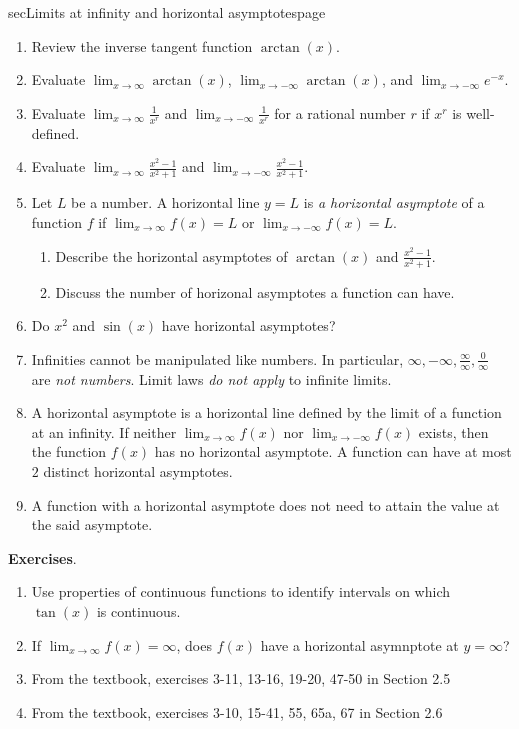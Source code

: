 \documentclass[../main]{subfiles}
\begin{document}
\begin{outline}{sec}{Limits at infinity and horizontal asymptotes}{page}
\begin{enumerate}
    \item Review the inverse tangent function \(\arctan(x)\).
    \item Evaluate \(\lim_{x \to \infty} \arctan(x)\), \(\lim_{x \to -\infty} \arctan(x)\), and \({\lim_{x \to -\infty}} e^{-x}\).
    \item Evaluate \({\lim_{x \to \infty}} \frac{1}{x^{r}}\) and \({\lim_{x \to -\infty}} \frac{1}{x^{r}}\) for a rational number \(r\) if \(x^{r}\) is well-defined.
    \item Evaluate \(\lim_{x \to \infty} \frac{x^{2} - 1}{x^{2} + 1}\) and \(\lim_{x \to -\infty} \frac{x^{2} - 1}{x^{2} + 1}\).
    \item {Let \(L\) be a number. A horizontal line \(y = L\) is \emph{a horizontal asymptote} of a function \(f\) if \(\lim_{x \to \infty} f(x) = L\) or \(\lim_{x \to -\infty} f(x) = L\).}
          \begin{enumerate}
            \item Describe the horizontal asymptotes of \(\arctan(x)\) and \(\frac{x^{2} - 1}{x^{2} + 1}\).
            \item Discuss the number of horizonal asymptotes a function can have.
          \end{enumerate}
    \item Do \(x^{2}\) and \(\sin(x)\) have horizontal asymptotes?
    \item {Infinities cannot be manipulated like numbers. In particular, \(\infty, -\infty, \frac{\infty}{\infty}, \frac{0}{\infty}\) are \emph{not numbers}. Limit laws \emph{do not apply} to infinite limits.}
    \item {A horizontal asymptote is a horizontal line defined by the limit of a function at an infinity. If neither \({\lim_{x \to \infty}} f(x)\) nor \({\lim_{x \to -\infty}} f(x)\) exists, then the function \(f(x)\) has no horizontal asymptote.  A function can have at most \(2\) distinct horizontal asymptotes.}
    \item {A function with a horizontal asymptote does not need to attain the value at the said asymptote.}
  \end{enumerate}
\end{outline}


%
%
\textbf{Exercises}.
\begin{enumerate}
\item Use properties of continuous functions to identify intervals on which \(\tan(x)\) is continuous.
\item If \({\lim_{x \to \infty}} f(x) = \infty\), does \(f(x)\) have a horizontal asymnptote at \(y = \infty\)?
\item From the textbook, exercises 3-11, 13-16, 19-20, 47-50 in Section 2.5
\item From the textbook, exercises 3-10, 15-41, 55, 65a, 67 in Section 2.6
\end{enumerate}
\end{document}
